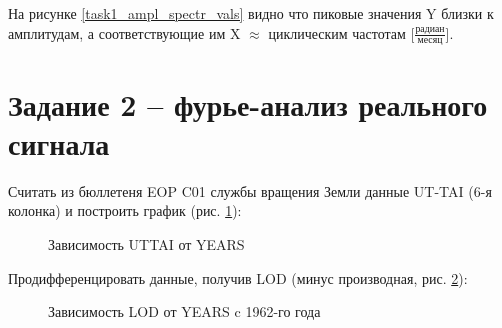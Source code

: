\documentclass[a4paper,oneside,14pt]{extreport}
\begin{document}
На рисунке \ref{task1_ampl_spectr_vals} видно что пиковые значения Y близки к амплитудам, а соответствующие им X $\approx$ циклическим частотам [$\frac{\text{радиан}}{\text{месяц}}$].

\section*{Задание 2 – фурье-анализ реального сигнала}
Считать из бюллетеня EOP C01 службы вращения Земли данные UT-TAI (6-я колонка) и построить график (рис. \ref{task2_g1}):

\begin{figure}[h]
	\caption{Зависимость UTTAI от YEARS}
	\label{task2_g1}
\end{figure}

\newpage
Продифференцировать данные, получив LOD (минус производная, рис. \ref{task2_g2}):

\begin{figure}[h]
	\caption{Зависимость LOD от YEARS c 1962-го года}
	\label{task2_g2}
\end{figure}
\end{document}
